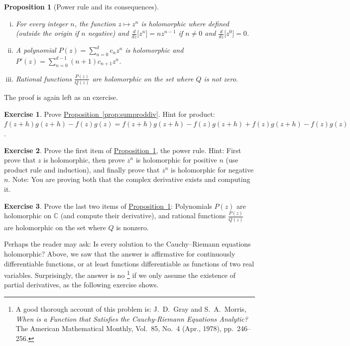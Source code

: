 \documentclass[12pt,openany]{book}
\newcommand{\C}{{\mathbb{C}}}
\theoremstyle{plain}
\newtheorem{prop}[thm]{Proposition}
\theoremstyle{remark}
\theoremstyle{definition}
\newenvironment{exbox}{%
    \def\FrameCommand{\vrule width 1pt \relax\hspace{10pt}}%
    \MakeFramed{\advance\hsize-\width\FrameRestore}%
}{%
    \endMakeFramed
}
\theoremstyle{exercise}
\newtheorem{exercise}{Exercise}[section]
\theoremstyle{example}
\newcommand{\propref}[1]{\hyperref[#1]{Proposition~\ref*{#1}}}
\begin{document}
\begin{prop}[Power rule and its consequences] \label{prop:powerrule}
\leavevmode
\begin{enumerate}[(i)]
\item For every integer $n$, the function $z \mapsto z^n$ is holomorphic
where defined (outside the origin if $n$ negative) and
$\frac{d}{dz}\bigl[ z^n \bigr] = n z^{n-1}$
if $n \neq 0$ and $\frac{d}{dz}\bigl[ z^0 \bigr] = 0$.
\item
A polynomial $P(z) = \sum_{n=0}^d c_n z^n$ is
holomorphic and
$P'(z) = \sum_{n=0}^{d-1} (n+1) c_{n+1} z^n$.
\item Rational functions $\frac{P(z)}{Q(z)}$
are holomorphic on the set where $Q$ is not zero.
\end{enumerate}
\end{prop}

The proof is again left as an exercise.

\begin{exbox}
\begin{exercise}
Prove \propref{prop:sumproddiv}.
Hint for product: 
$f(z+h)g(z+h) - f(z)g(z) =
f(z+h)g(z+h) - f(z)g(z+h) +
f(z)g(z+h) - f(z)g(z)$.
\end{exercise}

\begin{exercise}
Prove the first item of \propref{prop:powerrule}, the power rule.
Hint: First prove that $z$ is holomorphic,
then prove $z^n$ is holomorphic for positive $n$ (use product rule and
induction), and finally prove
that $z^n$ is holomorphic for negative $n$.
Note: You are proving both that the complex derivative exists and
computing it.
\end{exercise}

\begin{exercise}
Prove the last two items of \propref{prop:powerrule}:
Polynomials $P(z)$ are holomorphic on $\C$ (and compute their derivative),
and rational functions
$\frac{P(z)}{Q(z)}$ are holomorphic on the set where $Q$ is nonzero.
\end{exercise}
\end{exbox}

Perhaps the reader may ask:
Is every solution to
the Cauchy--Riemann equations holomorphic?  Above, we saw that the answer
is affirmative for continuously differentiable functions, or at least
functions differentiable as functions of two real variables.
Surprisingly, the answer is no%
\footnote{%
A good thorough account of this problem is:
J.\ D.\ Gray and  S.\ A.\ Morris,
\emph{When is a Function that Satisfies the Cauchy-Riemann Equations
Analytic?}  The American Mathematical Monthly, Vol.\ 85, No.\ 4 (Apr.,
1978), pp.\ 246--256.} if we only assume the existence of partial derivatives,
as the following exercise shows.
\end{document}
